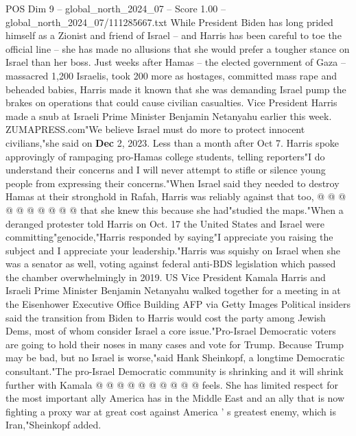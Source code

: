 \begin{textsample}{POS Dim 9 – global\_north\_2024\_07 – Score 1.00 – global\_north\_2024\_07/111285667.txt}  \label{ex:f9_pos_315}
While President Biden has long prided himself as a Zionist and friend of Israel -- and Harris has been careful to toe the official line -- she has made no allusions that she would prefer a tougher stance on Israel than her boss.
Just weeks after Hamas -- the elected government of Gaza -- massacred 1,200 Israelis, took 200 more as hostages, committed mass rape and beheaded babies, Harris made it known that she was demanding Israel pump the brakes on operations that could cause civilian casualties.
Vice President Harris made a snub at Israeli Prime Minister Benjamin Netanyahu earlier this week.
ZUMAPRESS.com"We believe Israel must do more to protect innocent civilians,"she said on \textbf{Dec} 2, 2023.
Less than a month after Oct 7.
Harris spoke approvingly of rampaging pro-Hamas college students, telling reporters"I do understand their concerns and I will never attempt to stifle or silence young people from expressing their concerns."When Israel said they needed to destroy Hamas at their stronghold in Rafah, Harris was reliably against that too, @ @ @ @ @ @ @ @ @ @ that she knew this because she had"studied the maps."When a deranged protester told Harris on Oct. 17 the United States and Israel were committing"genocide,"Harris responded by saying"I appreciate you raising the subject and I appreciate your leadership."Harris was squishy on Israel when she was a senator as well, voting against federal anti-BDS legislation which passed the chamber overwhelmingly in 2019.
US Vice President Kamala Harris and Israeli Prime Minister Benjamin Netanyahu walked together for a meeting in at the Eisenhower Executive Office Building AFP via Getty Images Political insiders said the transition from Biden to Harris would cost the party among Jewish Dems, most of whom consider Israel a core issue."Pro-Israel Democratic voters are going to hold their noses in many cases and vote for Trump.
Because Trump may be bad, but no Israel is worse,"said Hank Sheinkopf, a longtime Democratic consultant."The pro-Israel Democratic community is shrinking and it will shrink further with Kamala @ @ @ @ @ @ @ @ @ @ feels.
She has limited respect for the most important ally America has in the Middle East and an ally that is now fighting a proxy war at great cost against America ' s greatest enemy, which is Iran,"Sheinkopf added.

\end{textsample}
